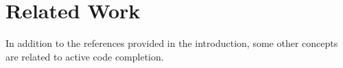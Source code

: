 \documentclass[10pt, conference, compsocconf]{IEEEtran}
\begin{document}
%
%
%
%	
%	
%	
%		
\section{Related Work}
In addition to the references provided in the introduction, some other concepts are related to active code completion.
\end{document}
